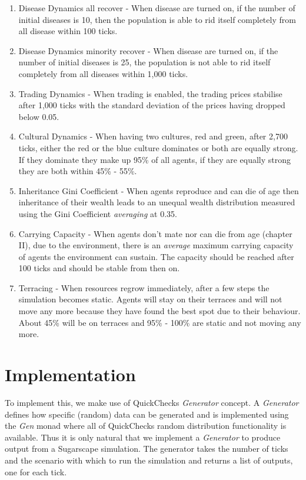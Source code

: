 \begin{enumerate}
	\item Disease Dynamics all recover - When disease are turned on, if the number of initial diseases is 10, then the population is  able to rid itself completely from all disease within 100 ticks. 
	
	\item Disease Dynamics minority recover - When disease are turned on, if the number of initial diseases is 25, the population is not able to rid itself completely from all diseases within 1,000 ticks.
	
	\item Trading Dynamics - When trading is enabled, the trading prices stabilise after 1,000 ticks with the standard deviation of the prices having dropped below 0.05.
	
	\item Cultural Dynamics - When having two cultures, red and green, after 2,700 ticks, either the red or the blue culture dominates or both are equally strong. If they dominate they make up 95\% of all agents, if they are equally strong they are both within 45\% - 55\%.
	
	\item Inheritance Gini Coefficient - When agents reproduce and can die of age then inheritance of their wealth leads to an unequal wealth distribution measured using the Gini Coefficient \textit{averaging} at 0.35. 

	\item Carrying Capacity - When agents don't mate nor can die from age (chapter II), due to the environment, there is an \textit{average} maximum carrying capacity of agents the environment can sustain. The capacity should be reached after 100 ticks and should be stable from then on.
		
	\item Terracing - When resources regrow immediately, after a few steps the simulation becomes static. Agents will stay on their terraces and will not move any more because they have found the best spot due to their behaviour. About 45\% will be on terraces and 95\% - 100\% are static and not moving any more.
\end{enumerate}

\section{Implementation}
To implement this, we make use of QuickChecks \textit{Generator} concept. A \textit{Generator} defines how specific (random) data can be generated and is implemented using the \textit{Gen} monad where all of QuickChecks random distribution functionality is available. Thus it is only natural that we implement a \textit{Generator} to produce output from a Sugarscape simulation. The generator takes the number of ticks and the scenario with which to run the simulation and returns a list of outputs, one for each tick.

